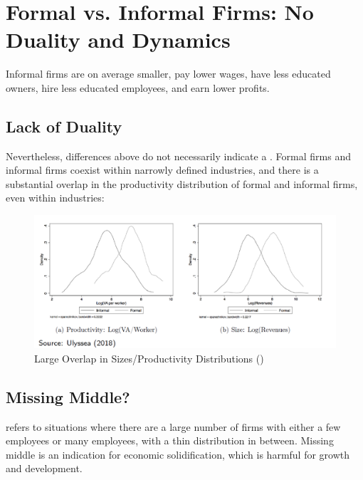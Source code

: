     \section{Formal vs. Informal Firms: No Duality and Dynamics}
            Informal firms are on average smaller, pay lower wages, have less educated owners, hire less educated employees, and earn lower profits.
            
            \subsection{Lack of Duality}
                 Nevertheless, differences above do not necessarily indicate a . Formal firms and informal firms coexist within narrowly defined industries, and there is a substantial overlap in the productivity distribution of formal and informal firms, even within industries:
                \begin{figure}[H]
                    \centering
                    \includegraphics[width=5.5in]{images/ch5/duality.png}
                    \caption{Large Overlap in Sizes/Productivity Distributions (\cite{ulyssea_firms_2018})}
                \end{figure}
            
            \subsection{Missing Middle?}
                 refers to situations where there are a large number of firms with either a few employees or many employees, with a thin distribution in between. Missing middle is an indication for economic solidification, which is harmful for growth and development.
                

